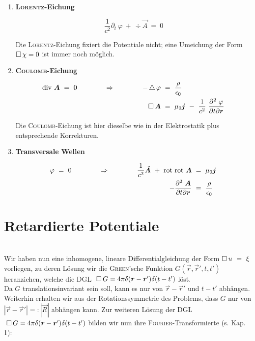 \begin{enumerate}

\item \textbf{\textsc{Lorentz}-Eichung}

\begin{equation*}
\frac{1}{c^2} \partial_t \ \varphi \ + \ \div\vec{A} \ = \ 0
\end{equation*}

Die \textsc{Lorentz}-Eichung fixiert die Potentiale nicht; eine Umeichung der Form $\mathop{{}\Box}\nolimits\chi=0$ ist immer noch möglich.

\item \textbf{\textsc{Coulomb}-Eichung}

\begin{align*}
\div\vec{A} \ = \ 0 \qquad\qquad \Rightarrow \qquad\qquad -\laplace\varphi \ &= \ \frac{\rho}{\epsilon_0}\\
\Dalembert\vec{A} \ &= \ \mu_0\vec{j} \  - \ \frac{1}{c^2}\ \frac{\partial^2 \ \varphi}{\partial t \partial \vec{r}} 
\end{align*}

Die \textsc{Coulomb}-Eichung ist hier dieselbe wie in der Elektrostatik plus entsprechende Korrekturen.

\item \textbf{Transversale Wellen}

\begin{align*}
\varphi \ = \ 0 \qquad\qquad\Rightarrow\qquad\qquad \frac{1}{c^2}\ddot{\vec{A}}\ + \ \rot\rot\vec{A} \ &= \ \mu_0\vec{j}\\
- \frac{\partial^2 \ \vec{A}}{\partial t \partial \vec{r}}  \ &= \ \frac{\rho}{\epsilon_0} 
\end{align*}
\end{enumerate}

\section{Retardierte Potentiale}

\ \\
Wir haben nun eine inhomogene, lineare Differentialgleichung der Form $\mathop{{}\Box}\nolimits u \ = \ \xi$ vorliegen, zu deren Lösung wir die \textsc{Green}'sche Funktion $G(\vec{r},\vec{r}',t,t')$ heranziehen, welche die DGL $\;\mathop{{}\Box}\nolimits G = 4\pi \delta(\bm{r}-\bm{r}')\delta(t-t')$ löst.\\
Da $G$ translationsinvariant sein soll, kann es nur von $\vec{r}-\vec{r}'$ und $t-t'$ abhängen. Weiterhin erhalten wir aus der Rotationssymmetrie des Problems, dass $G$ nur von $|\vec{r}-\vec{r}'|=:|\vec{R}|$ abhängen kann.
\newpage
Zur weiteren Lösung der DGL $\; \mathop{{}\Box}\nolimits G = 4\pi\delta(\bm{r}-\bm{r}')\delta(t-t')$ bilden wir nun ihre \textsc{Fourier}-Transformierte (s. Kap. 1):

